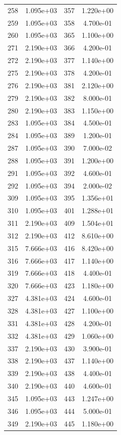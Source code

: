 \documentclass[12pt]{article}
\begin{document}
\begin{longtable}{@{}cccc@{}}
258 & 1.095e+03 & 357 & 1.220e+00 \\
259 & 1.095e+03 & 358 & 4.700e-01 \\
260 & 1.095e+03 & 365 & 1.100e+00 \\
271 & 2.190e+03 & 366 & 4.200e-01 \\
272 & 2.190e+03 & 377 & 1.140e+00 \\
275 & 2.190e+03 & 378 & 4.200e-01 \\
276 & 2.190e+03 & 381 & 2.120e+00 \\
279 & 2.190e+03 & 382 & 8.000e-01 \\
280 & 2.190e+03 & 383 & 1.150e+00 \\
283 & 1.095e+03 & 384 & 4.500e-01 \\
284 & 1.095e+03 & 389 & 1.200e-01 \\
287 & 1.095e+03 & 390 & 7.000e-02 \\
288 & 1.095e+03 & 391 & 1.200e+00 \\
291 & 1.095e+03 & 392 & 4.600e-01 \\
292 & 1.095e+03 & 394 & 2.000e-02 \\
309 & 1.095e+03 & 395 & 1.356e+01 \\
310 & 1.095e+03 & 401 & 1.288e+01 \\
311 & 2.190e+03 & 409 & 1.504e+01 \\
312 & 2.190e+03 & 412 & 8.610e+00 \\
315 & 7.666e+03 & 416 & 8.420e+00 \\
316 & 7.666e+03 & 417 & 1.140e+00 \\
319 & 7.666e+03 & 418 & 4.400e-01 \\
320 & 7.666e+03 & 423 & 1.180e+00 \\
327 & 4.381e+03 & 424 & 4.600e-01 \\
328 & 4.381e+03 & 427 & 1.100e+00 \\
331 & 4.381e+03 & 428 & 4.200e-01 \\
332 & 4.381e+03 & 429 & 1.060e+00 \\
337 & 2.190e+03 & 430 & 3.900e-01 \\
338 & 2.190e+03 & 437 & 1.140e+00 \\
339 & 2.190e+03 & 438 & 4.400e-01 \\
340 & 2.190e+03 & 440 & 4.600e-01 \\
345 & 1.095e+03 & 443 & 1.247e+00 \\
346 & 1.095e+03 & 444 & 5.000e-01 \\
349 & 2.190e+03 & 445 & 1.180e+00 \\

\end{longtable}
\end{document}
